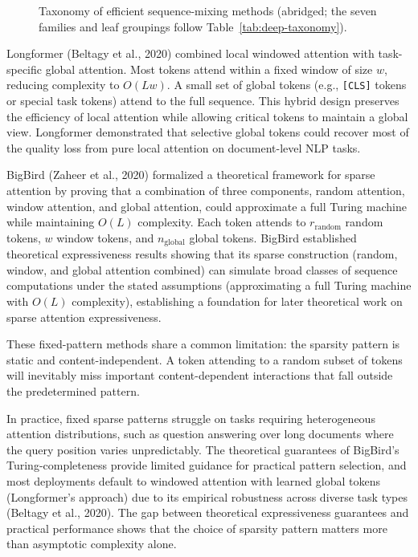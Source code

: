 \documentclass[10pt,twocolumn]{article}
\begin{document}
\begin{figure}[!tbp]
\centering
\resizebox{0.95\textwidth}{!}{}
\caption{Taxonomy of efficient sequence-mixing methods (abridged; the seven families and leaf groupings follow Table~\ref{tab:deep-taxonomy}).}\label{fig:taxonomy}
\end{figure}

Longformer (Beltagy et al., 2020) combined local windowed attention with task-specific global attention. Most tokens attend within a fixed window of size $w$, reducing complexity to $O(Lw)$. A small set of global tokens (e.g., \texttt{[CLS]} tokens or special task tokens) attend to the full sequence. This hybrid design preserves the efficiency of local attention while allowing critical tokens to maintain a global view. Longformer demonstrated that selective global tokens could recover most of the quality loss from pure local attention on document-level NLP tasks.

BigBird (Zaheer et al., 2020) formalized a theoretical framework for sparse attention by proving that a combination of three components, random attention, window attention, and global attention, could approximate a full Turing machine while maintaining $O(L)$ complexity. Each token attends to $r_{\mathrm{random}}$ random tokens, $w$ window tokens, and $n_{\mathrm{global}}$ global tokens. BigBird established theoretical expressiveness results showing that its sparse construction (random, window, and global attention combined) can simulate broad classes of sequence computations under the stated assumptions (approximating a full Turing machine with $O(L)$ complexity), establishing a foundation for later theoretical work on sparse attention expressiveness.

These fixed-pattern methods share a common limitation: the sparsity pattern is static and content-independent. A token attending to a random subset of tokens will inevitably miss important content-dependent interactions that fall outside the predetermined pattern.

In practice, fixed sparse patterns struggle on tasks requiring heterogeneous attention distributions, such as question answering over long documents where the query position varies unpredictably. The theoretical guarantees of BigBird's Turing-completeness provide limited guidance for practical pattern selection, and most deployments default to windowed attention with learned global tokens (Longformer's approach) due to its empirical robustness across diverse task types (Beltagy et al., 2020). The gap between theoretical expressiveness guarantees and practical performance shows that the choice of sparsity pattern matters more than asymptotic complexity alone.
\end{document}
